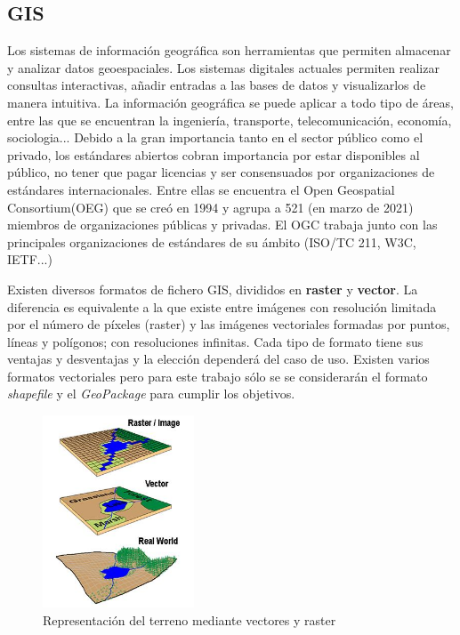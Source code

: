 \subsection{GIS} Los sistemas de información geográfica son herramientas que permiten almacenar y analizar datos
geoespaciales. Los sistemas digitales actuales permiten realizar consultas interactivas, añadir entradas a las
bases de datos y visualizarlos de manera intuitiva. La información geográfica se puede aplicar a todo tipo de
áreas, entre las que se encuentran la ingeniería, transporte, telecomunicación, economía, sociologia... Debido a
la gran importancia tanto en el sector público como el privado\cite{gis-standards}, los estándares abiertos
cobran importancia por estar disponibles al público, no tener que pagar licencias y ser consensuados por
organizaciones de estándares internacionales. Entre ellas se encuentra el Open Geospatial Consortium(OEG) que se creó
en 1994 y agrupa a 521 (en marzo de 2021) miembros de organizaciones públicas y privadas.\cite{ogc-members}
El OGC trabaja junto con las principales organizaciones de estándares de su ámbito (ISO/TC 211, W3C,
IETF...) \cite{ogc-whitepaper}

Existen diversos formatos de fichero GIS, divididos en \textbf{raster} y \textbf{vector}. La diferencia es
equivalente a la que existe entre imágenes con resolución limitada por el número de píxeles (raster) y las 
imágenes vectoriales formadas por puntos, líneas y polígonos; con resoluciones infinitas. Cada tipo de formato
tiene sus ventajas y desventajas y la elección dependerá del caso de uso. Existen varios formatos vectoriales
pero para este trabajo sólo se se considerarán el formato \textit{shapefile} y el \textit{GeoPackage} para cumplir
los objetivos.

\begin{figure}[H]
    \includegraphics[width=0.4\textwidth]{images/vector-raster.jpg}
    \centering
    \caption{Representación del terreno mediante vectores y raster}
    \label{fig:vector-raster}
\end{figure}

